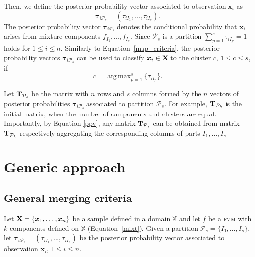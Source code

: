 \documentclass[submit]{smj}
\DeclareMathOperator*{\argmax}{arg\,max}
\theoremstyle{definition}
\newcommand{\m}[1]{\boldsymbol{#1}}
\newcommand{\fmm}{\textsc{fmm}\xspace}
\newcommand{\X}{\text{\textbf{X}}}
\begin{document}
Then, we define the posterior probability vector associated to observation $\m x_i$ as
\begin{equation}\label{ppv}
\m\tau_{i \mathcal{P}_s} = \left(\tau_{i I_1} , \dots, \tau_{i I_s}  \right).
\end{equation}
The posterior probability vector $\m \tau_{i \mathcal{P}_s}$ denotes the conditional probability that $\m x_i$ arises from mixture components $f_{I_1}, \dots, f_{I_s}$. Since $\mathcal{P}_s$ is a partition $\sum_{p=1}^s \tau_{i I_p} = 1$ holds  for $1 \leq i \leq n$. Similarly to Equation~\ref{map_criteria}, the posterior probability vectors $\m\tau_{i \mathcal{P}_s}$ can be used to classify $\m x_i \in \X$ to the cluster $c$, $1\leq c\leq s$, if
\begin{equation}\label{cluster_criteria}
c= \argmax_{p=1}^s \{ \tau_{i I_p} \}.
\end{equation}

Let $\text{\textbf{T}}_{\mathcal{P}_s}$ be the matrix with $n$ rows and $s$ columns formed by the $n$ vectors of posterior probabilities $\m \tau_{i\mathcal{P}_s}$ associated to partition $\mathcal{P}_s$. For example, $\text{\textbf{T}}_{\mathcal{P}_k}$ is the initial matrix, when the number of components and clusters are equal. Importantly, by Equation \ref{ppv}, any matrix $\text{\textbf{T}}_{\mathcal{P}_s}$ can be obtained from matrix $\text{\textbf{T}}_{\mathcal{P}_k}$ respectively aggregating the corresponding columns of parts $I_1, \dots, I_s$.


\section{Generic approach}\label{generic_merging}

\subsection{General merging criteria}\label{merging_criteria}

Let $\text{\textbf{X}} = \{\m x_1,\dots,\m x_n \}$ be a sample defined in  a domain $\mathbb{X}$ and let $f$ be a \fmm with $k$ components defined on $\mathbb{X}$ (Equation~\ref{mixt}). Given a partition $\mathcal{P}_s = \{I_1, \dots, I_s\}$, let $\m\tau_{i \mathcal{P}_s}= \left( \tau_{i I_1} , \dots, \tau_{i I_s}  \right)$ be the posterior probability vector associated to observation $\m x_i$, $1\leq i \leq n $.
\end{document}
